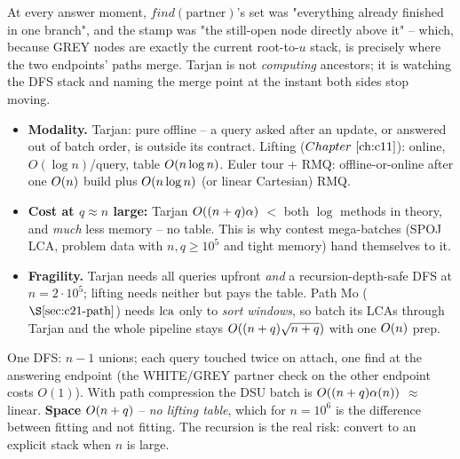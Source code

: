 \begin{insightbox}
At every answer moment, \(\mathit{find}(\text{partner})\)'s set was "everything
already finished in one branch", and the stamp was "the still-open node
directly above it" -- which, because GREY nodes are exactly the current
root-to-\(u\) stack, is precisely where the two endpoints' paths merge.  Tarjan
is not \emph{computing} ancestors; it is watching the DFS stack and naming the
merge point at the instant both sides stop moving.
\end{insightbox}

\begin{comparisonbox}
\begin{itemize}[nosep,leftmargin=1.4em]
  \item \textbf{Modality.} Tarjan: pure offline -- a query asked after an
        update, or answered out of batch order, is outside its contract.
        Lifting (\(\chref{c11}\)): online, \(O(\log n)\)/query, table
        \(O(n\log n)\).  Euler tour + RMQ: offline-or-online after one
        \(O(n)\) build plus \(O(n\log n)\) (or linear Cartesian) RMQ.
  \item \textbf{Cost at \(q \approx n\) large:} Tarjan \(O((n+q)\alpha)\)
        \(<\) both \(\log\) methods in theory, and \emph{much} less memory --
        no table.  This is why contest mega-batches (SPOJ LCA, problem data with
        \(n,q\ge10^5\) and tight memory) hand themselves to it.
  \item \textbf{Fragility.} Tarjan needs all queries upfront \emph{and} a
        recursion-depth-safe DFS at \(n=2\cdot10^5\); lifting needs neither but
        pays the table.  Path Mo (\(\secref{c21-path}\)) needs \(\operatorname{lca}\) only to
        \emph{sort windows}, so batch its LCAs through Tarjan and the whole
        pipeline stays \(O((n+q)\sqrt{n+q})\) with one \(O(n)\) prep.
\end{itemize}
\end{comparisonbox}

\begin{complexitybox}[Tarjan]
One DFS: \(n-1\) unions; each query touched twice on attach, one find at the
answering endpoint (the WHITE/GREY partner check on the other endpoint costs
\(O(1)\)).  With path compression the DSU batch is \(O((n+q)\alpha(n))\)
\(\approx\) linear.  \textbf{Space} \(O(n+q)\) -- \emph{no lifting table},
which for \(n=10^6\) is the difference between fitting and not fitting.  The
recursion is the real risk: convert to an explicit stack when \(n\) is large.
\end{complexitybox}

